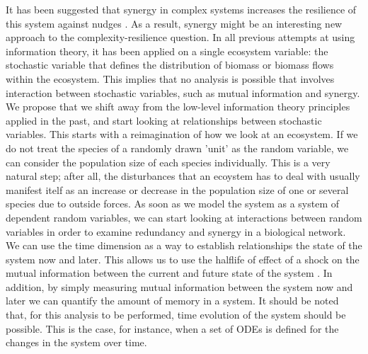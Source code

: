 \documentclass[../main.tex]{subfiles}
\begin{document}
It has been suggested that synergy in complex systems increases the resilience of this system against nudges \cite{quax2017quantifying}.
As a result, synergy might be an interesting new approach to the complexity-resilience question.
In all previous attempts at using information theory, it has been applied on a single ecosystem variable: the stochastic variable that defines the distribution of biomass or biomass flows within the ecosystem.
This implies that no analysis is possible that involves interaction between stochastic variables, such as mutual information and synergy.
We propose that we shift away from the low-level information theory principles applied in the past, and start looking at relationships between stochastic variables.
This starts with a reimagination of how we look at an ecosystem.
If we do not treat the species of a randomly drawn 'unit' as the random variable, we can consider the population size of each species individually.
This is a very natural step; after all, the disturbances that an ecoystem has to deal with usually manifest itelf as an increase or decrease in the population size of one or several species due to outside forces.
As soon as we model the system as a system of dependent random variables, we can start looking at interactions between random variables in order to examine redundancy and synergy in a biological network.
We can use the time dimension as a way to establish relationships the state of the system now and later.
This allows us to use the halflife of effect of a shock on the mutual information between the current and future state of the system \cite{QuaxPersonal}.
In addition, by simply measuring mutual information between the system now and later we can quantify the amount of memory in a system.
It should be noted that, for this analysis to be performed, time evolution of the system should be possible.
This is the case, for instance, when a set of ODEs is defined for the changes in the system over time.
\end{document}
